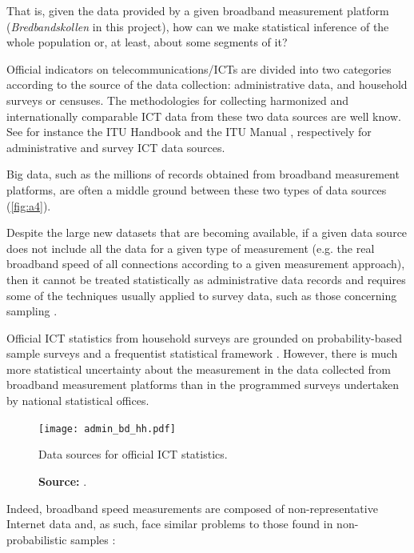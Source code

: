 \documentclass[12pt]{article}
\begin{document}
That is, given the data provided by a given broadband measurement platform (\textit{Bredbandskollen} in this project), how can we make statistical inference of the whole population or, at least, about some segments of it? 

Official indicators on telecommunications/ICTs are divided into two categories according to the source of the data collection: administrative data, and household surveys or censuses. The methodologies for collecting harmonized and internationally comparable ICT data from these two data sources are well know. See for instance the ITU Handbook \citep{handbook} and the ITU Manual \citep{manual}, respectively for administrative and survey ICT data sources.   

Big data, such as the millions of records obtained from broadband measurement platforms, are often a middle ground between these two types of data sources (\autoref{fig:a4}). 

Despite the large new datasets that are becoming available, if a given data source does not include all the data for a given type of measurement (e.g. the real broadband speed of all connections according to a given measurement approach), then it cannot be treated statistically as administrative data records and requires some of the techniques usually applied to survey data, such as those concerning sampling \citep{bigdata}.

Official ICT statistics from household surveys are grounded on probability-based sample surveys and a frequentist statistical framework \citep{couper2013}. However, there is much more statistical uncertainty about the measurement in the data collected from broadband measurement platforms than in the programmed surveys undertaken by national statistical offices. 

\begin{figure}[H]
    \centering
        \texttt{[image: admin\_bd\_hh.pdf]}
        \caption{Data sources for official ICT statistics.}
        \caption*{\textbf{Source:} \cite{margus}.}
        \label{fig:a4}
\end{figure}   

Indeed, broadband speed measurements are composed of non-representative Internet data and, as such, face similar problems to those found in non-probabilistic samples \citep{couper2013,zagheni2015}:
\end{document}
